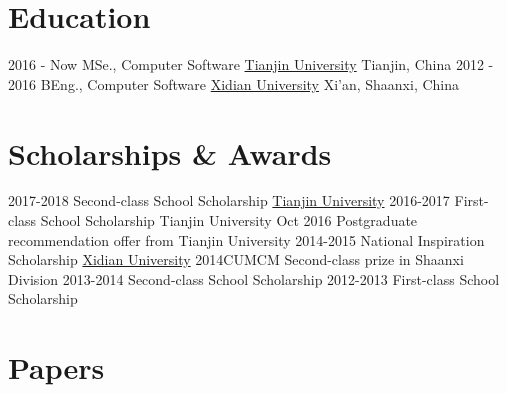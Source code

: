 \documentclass[letterpaper]{twentysecondcv} %
\begin{document}
\makeprofile %

\section{Education}

\begin{twenty} %
    \twentyitem
        {2016 - Now}
        {MSe., Computer Software}
        {\href{http://tju.edu.cn/}{Tianjin University}}
        {Tianjin, China}
        {}
    \twentyitem
        {2012 - 2016}
        {BEng., Computer Software}
        {\href{http://www.xidian.edu.cn/}{Xidian University}}
        {Xi'an, Shaanxi, China}
        {}
\end{twenty}



\section{Scholarships \& Awards}

\begin{twenty}
    \twentyitem
        {2017-2018}
        {Second-class School Scholarship}
        {\href{http://tju.edu.cn/}{Tianjin University}}
        {}
        {}
    \twentyitem
        {2016-2017}
        {First-class School Scholarship}
        {Tianjin University}
        {}
        {}
    \twentyitem
        {Oct 2016}
        {Postgraduate recommendation offer from Tianjin University}
        {}
        {}
        {}
    \twentyitem
        {2014-2015}
        {National Inspiration Scholarship}
        {\href{http://www.xidian.edu.cn/}{Xidian University}}
        {}
        {}
    \twentyitem
        {2014CUMCM}
        {Second-class prize in Shaanxi Division}
        {}
        {}
        {}
    \twentyitem
        {2013-2014}  
        {Second-class School Scholarship}
        {}
        {}
        {}
    \twentyitem        
        {2012-2013}
        {First-class School Scholarship}
        {}
        {}
        {}        
\end{twenty}

\section{Papers}
\end{document}
